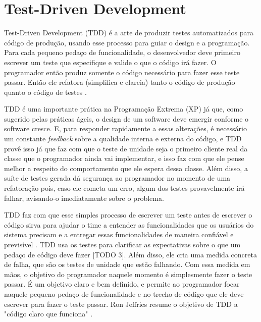 \chapter{Test-Driven Development}
\label{cap:tdd}

Test-Driven Development (TDD) é a arte de produzir testes automatizados para código de produção, usando
esse processo para guiar o design e a programação. Para cada pequeno pedaço de funcionalidade, o desenvolvedor
deve primeiro escrever um teste que especifique e valide o que o código irá fazer. O programador então produz
somente o código necessário para fazer esse teste passar. Então ele refatora (simplifica e clareia) tanto o
código de produção quanto o código de testes \cite{agilealliance-tdd} \cite{tdd-taxonomy}.

TDD é uma importante prática na Programação Extrema (XP) \cite{XPExplained} já que, como sugerido pelas práticas
ágeis, o design de um software deve emergir conforme o software cresce. E, para responder rapidamente a essas
alterações, é necessário um constante \textit{feedback} sobre a qualidade interna e externa do código, e TDD
provê isso já que faz com que o teste de unidade seja o primeiro cliente real da classe que o programador ainda
vai implementar, e isso faz com que ele pense melhor a respeito do comportamento que ele espera dessa classe. Além disso,
a suíte de testes gerada dá segurança ao programador no momento de uma refatoração pois, caso ele cometa um erro,
algum dos testes provavelmente irá falhar, avisando-o imediatamente sobre o problema.

TDD faz com que esse simples processo de escrever um teste antes de escrever o código
sirva para ajudar o time a entender as funcionalidades que os usuários do sistema precisam e 
a entregar essas funcionalidades de maneira confiável e previsível \cite{GOOS}. TDD usa os testes para clarificar as expectativas
sobre o que um pedaço de código deve fazer [TODO 3]. Além disso, ele cria uma medida concreta de falha, que são os testes de 
unidade que estão falhando. Com essa medida em mãos, o objetivo do programador naquele momento é simplesmente fazer o teste passar. É um
objetivo claro e bem definido, e permite ao programador focar naquele pequeno pedaço de funcionalidade e no trecho de código que ele 
deve escrever para fazer o teste passar. Ron Jeffries resume o objetivo de TDD a "código claro que funciona" \cite{TDDByExample}. 

